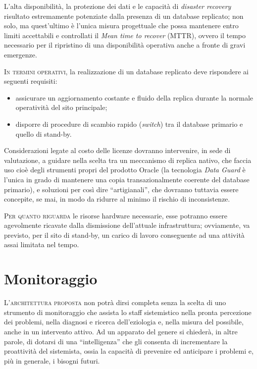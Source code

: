 \documentclass[headinclude,footinclude,a4paper,11pt,final]{scrreprt}
\begin{document}
L'alta disponibilità, la protezione dei dati e le capacità di \emph{disaster recovery} risultato estremamente potenziate dalla presenza di un database replicato; non solo, ma quest'ultimo è l'unica misura progettuale che possa mantenere entro limiti accettabili e controllati il \emph{Mean time to recover} (MTTR), ovvero il tempo necessario per il ripristino di una disponibilità operativa anche a fronte di gravi emergenze.

\bigskip

\lettrine{I}{n termini operativi}, la realizzazione di un database replicato deve rispondere ai seguenti requisiti:
\begin{itemize}
\item assicurare un aggiornamento costante e fluido della replica durante la normale operatività del sito principale;
\item disporre di procedure di scambio rapido (\emph{switch}) tra il database primario e quello di stand-by.
\end{itemize}

Considerazioni legate al costo delle licenze dovranno intervenire, in sede di valutazione, a guidare nella scelta tra un meccanismo di replica nativo, che faccia uso cioè degli strumenti propri del prodotto Oracle (la tecnologia \emph{Data Guard} è l'unica in grado di mantenere una copia transazionalmente coerente del database primario), e soluzioni per così dire “artigianali”, che dovranno tuttavia essere concepite, se mai, in modo da ridurre al minimo il rischio di inconsistenze.

\bigskip

\lettrine{P}{er quanto riguarda} le risorse hardware necessarie, esse potranno essere agevolmente ricavate dalla dismissione dell'attuale infrastruttura; ovviamente, va previsto, per il sito di stand-by, un carico di lavoro conseguente ad una attività assai limitata nel tempo.

\section{Monitoraggio}

\lettrine{L'}{architettura proposta} non potrà dirsi completa senza la scelta di uno strumento di monitoraggio che assista lo staff sistemistico nella pronta percezione dei problemi, nella diagnosi e ricerca dell'eziologia e, nella misura del possibile, anche in un intervento attivo.  Ad un apparato del genere si chiederà, in altre parole, di dotarsi di una “intelligenza” che gli consenta di incrementare la proattività del sistemista, ossia la capacità di prevenire ed anticipare i problemi e, più in generale, i bisogni futuri.
\end{document}
